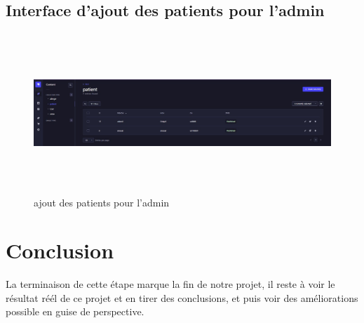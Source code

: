 \subsection{Interface d'ajout des patients pour l'admin}

\newpage

\begin{figure}[!h]
\begin{center}
\includegraphics[height=6cm,width=18cm]{backadmin.jpeg}
\end{center}
\caption{ajout des patients pour l'admin}
\end{figure}




\section{Conclusion}
La terminaison de cette étape marque la fin de notre projet, il reste à voir le résultat réél de ce projet et en tirer des conclusions, et puis voir des améliorations possible en guise de perspective.

